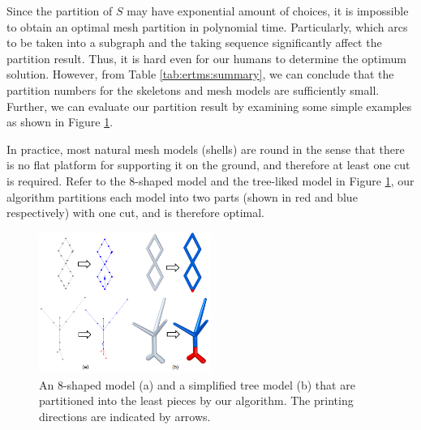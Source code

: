 Since the partition of $S$ may have exponential amount of choices, it is impossible to obtain an optimal mesh partition in polynomial time. Particularly, which arcs to be taken into a subgraph and the taking sequence significantly affect the partition result. Thus, it is hard even for our humans to determine the optimum solution. However, from Table \ref{tab:ertms:summary}, we can conclude that the partition numbers for the skeletons and mesh models are sufficiently small. Further, we can evaluate our partition result by examining some simple examples as shown in Figure \ref{fig:simpletree}.

In practice, most natural mesh models (shells) are round in the sense that there is no flat platform for supporting it on the ground, and therefore at least one cut is required. Refer to the 8-shaped model and the tree-liked model in Figure \ref{fig:simpletree}, our algorithm partitions each model into two parts (shown in red and blue respectively) with one cut, and is therefore optimal.

\begin{figure}[tbp]
  \centering
  \includegraphics[width=0.5\textwidth]{figs/simpletree.png}
  \caption{\label{fig:simpletree}%
           An 8-shaped model (a) and a simplified tree model (b) that are partitioned into the least pieces by our algorithm. The printing directions are indicated by arrows.}
\end{figure}



